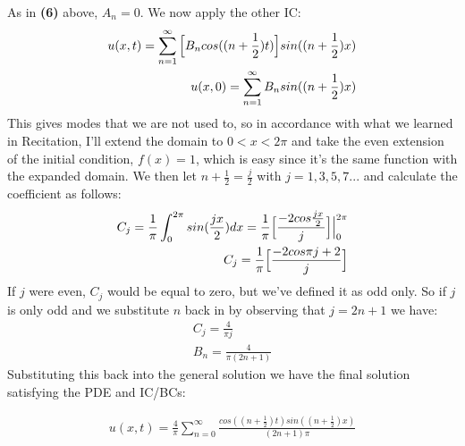 \documentclass{article}
\begin{document}
As in \textbf{(6)} above, $A_n = 0$. We now apply the other IC:
\begin{equation}
\begin{aligned}
u(x,t) = \sum^{\infty}_{n=1}\Big{[}B_ncos((n+\frac{1}{2})t)\Big{]}sin((n+\frac{1}{2})x)\\
u(x,0) = \sum_{n=1}^{\infty}B_nsin((n+\frac{1}{2})x)
\end{aligned}
\end{equation}
This gives modes that we are not used to, so in accordance with what we learned in Recitation, I'll extend the domain to $0 < x < 2\pi$ and take the even extension of the initial condition, $f(x) = 1$, which is easy since it's the same function with the expanded domain. We then let $n+\frac{1}{2} = \frac{j}{2}$ with $j = 1, 3, 5, 7...$ and calculate the coefficient as follows:
\begin{equation}
\begin{aligned}
C_j = \frac{1}{\pi}\int_0^{2\pi}sin(\frac{jx}{2})dx = \frac{1}{\pi}\Big{[}\frac{-2cos{\frac{jx}{2}}}{j}\Big{]}\Big{|}_0^{2\pi}\\
C_j = \frac{1}{\pi}\Big{[}\frac{-2cos{\pi j}+2}{j}\Big{]}	
\end{aligned}
\end{equation}
If $j$ were even, $C_j$ would be equal to zero, but we've defined it as odd only. So if $j$ is only odd and we substitute $n$ back in by observing that $j = 2n+1$ we have:
\begin{equation}
\begin{aligned}
C_j = \frac{4}{\pi j}\\
B_n = \frac{4}{\pi(2n+1)}
\end{aligned}
\end{equation}
Substituting this back into the general solution we have the final solution satisfying the PDE and IC/BCs:
\begin{tcolorbox}[minipage,colback=white,arc=0pt,outer arc=0pt]
\begin{equation}
\begin{aligned}
u(x,t) = \frac{4}{\pi}\sum^{\infty}_{n=0}\frac{cos((n+\frac{1}{2})t)sin((n+\frac{1}{2})x)}{(2n+1)\pi}
\end{aligned}
\end{equation}
\end{tcolorbox}
\end{document}

